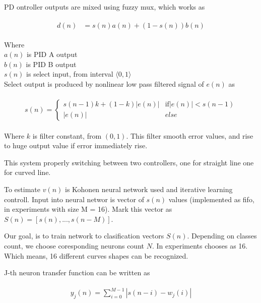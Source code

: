 \documentclass[twoside]{oss-conf-eng}
\begin{document}
PD ontroller outputs are mixed using fuzzy mux, which works as

\begin{eqnarray}
\begin{split}
\label{fuzzy_mux}
	d(n) &= s(n)a(n) + (1 - s(n))b(n)
\end{split}
\end{eqnarray}

Where \\
$a(n)$ is PID A output \\
$b(n)$ is PID B output \\
$s(n)$ is select input, from interval $\langle 0, 1 \rangle$ \\

Select output is produced by nonlinear low pass filtered signal of $e(n)$ as

\begin{eqnarray}
\begin{split}
\label{low_pass}
s(n) =
  \begin{cases}
    s(n-1)k + (1 - k)|e(n)| & \text{if} |e(n)| < s(n-1) \\
    |e(n)| & else
  \end{cases}
\end{split}
\end{eqnarray}

Where $k$ is filter constant, from $(0, 1)$. This filter smooth error
values, and rise to huge output value if error immediately rise.

This system properly switching between two controllers, one for straight line
one for curved line.

To estimate $v(n)$ is Kohonen neural network used \cite{kohonen_neural_network}
 and iterative learning controll. Input into neural networ is vector of $s(n)$ values
(implemented as fifo, in experiments with size M = 16). Mark this vector as $S(n) =
[s(n), ..., s(n - M)]$.

Our goal, is to train network to clasification vectors $S(n)$. Depending on classes count,
we choose coresponding neurons count $N$. In experiments chooses as 16. Which means, 16 different
curves shapes can be recognized.

J-th neuron transfer function can be written as

\begin{eqnarray}
\begin{split}
\label{neuron_transfer}
y_j(n) = \sum_{i = 0}^{M-1} {|s(n-i) - w_j(i)|}
\end{split}
\end{eqnarray}
\end{document}
